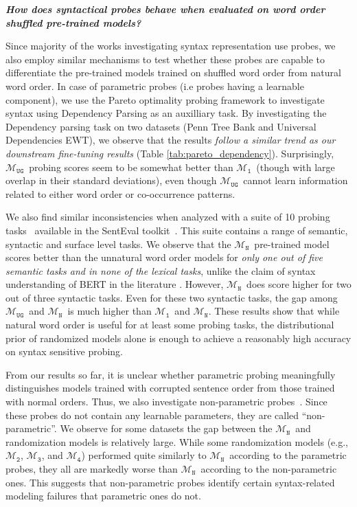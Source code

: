 \documentclass[12pt]{article}
\newcommand{\xit}[1]{{\noindent\textbf{\textit{#1}}}}
\newcommand{\OR}{$\mathcal{M}_{\texttt{N}}$}
\newcommand{\RI}{$\mathcal{M}_{\texttt{1}}$}
\newcommand{\RII}{$\mathcal{M}_{\texttt{2}}$}
\newcommand{\RIII}{$\mathcal{M}_{\texttt{3}}$}
\newcommand{\RIV}{$\mathcal{M}_{\texttt{4}}$}
\newcommand{\RC}{$\mathcal{M}_{\texttt{UG}}$}
\begin{document}
\xit{How does syntactical probes behave when evaluated on word order shuffled pre-trained models?}

Since majority of the works investigating syntax representation use probes, we also employ similar mechanisms to test whether these probes are capable to differentiate the pre-trained models trained on shuffled word order from natural word order. In case of parametric probes (i.e probes having a learnable component), we use the Pareto optimality probing framework \cite{pimentel2020b} to investigate syntax using Dependency Parsing as an auxilliary task. By investigating the Dependency parsing task on two datasets (Penn Tree Bank and Universal Dependencies EWT), we observe that the results \textit{follow a similar trend as our downstream fine-tuning results} (Table \ref{tab:pareto_dependency}). Surprisingly, \RC\ probing scores seem to be somewhat better than \RI\ (though with large overlap in their standard deviations), even though \RC\ cannot learn information related to either word order or co-occurrence patterns.



We also find similar inconsistencies when analyzed with a suite of 10 probing tasks~\cite{conneau-etal-2018-cram} available in the SentEval toolkit~\cite{conneau-kiela-2018-senteval}. This suite contains a range of semantic, syntactic and surface level tasks. We observe that the \OR\ pre-trained model scores better than the unnatural word order models for \textit{only one out of five semantic tasks and in none of the lexical tasks}, unlike the claim of syntax understanding of BERT in the literature \cite{jawahar2019a}. However, \OR\ does score higher for two out of three syntactic tasks. Even for these two syntactic tasks, the gap among \RC\ and \OR\ is much higher than \RI\ and \OR. These results show that while natural word order is useful for at least some probing tasks, the distributional prior of randomized models alone is enough to achieve a reasonably high accuracy on syntax sensitive probing.


From our results so far, it is unclear whether parametric probing meaningfully distinguishes models trained with corrupted sentence order from those trained with normal orders. Thus, we also investigate non-parametric probes~\cite{linzen-etal-2016-assessing,marvin-linzen-2018-targeted,gulordava2018,goldberga,wolf2019}. Since these probes do not contain any learnable parameters, they are called ``non-parametric''. We observe for some datasets \cite{linzen-etal-2016-assessing,marvin-linzen-2018-targeted} the gap between the \OR\ and randomization models is relatively large.
While some randomization models (e.g., \RII, \RIII, and \RIV) performed quite similarly to \OR\ according to the parametric probes, they all are markedly worse than \OR\ according to the non-parametric ones. This suggests that non-parametric probes identify certain syntax-related modeling failures
that parametric ones do not.
\end{document}
